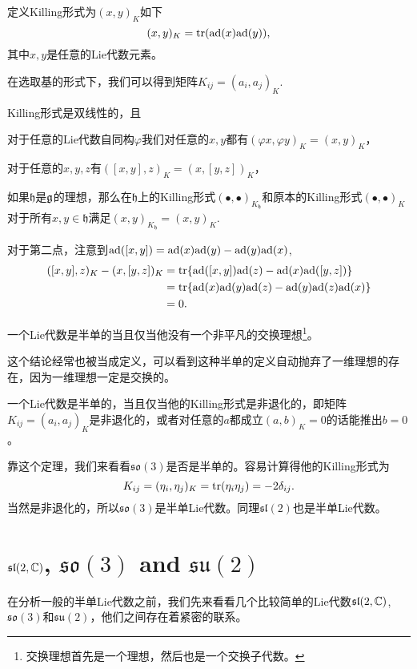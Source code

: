 \para
定义Killing形式为$(x,y)_K$如下
\[
	(x,y)_K=\operatorname{tr}({\mathrm{ad}}(x){\mathrm{ad}}(y)),
\]
其中$x,y$是任意的Lie代数元素。

在选取基的形式下，我们可以得到矩阵$K_{ij}=(a_i,a_j)_K$.

\begin{theo}
Killing形式是双线性的，且

对于任意的Lie代数自同构$\varphi$我们对任意的$x,y$都有$(\varphi x,\varphi y)_K=(x,y)_K$，

对于任意的$x,y,z$有$([x,y],z)_K=(x,[y,z])_K$，

如果$\mathfrak{h}$是${\mathfrak{g}}$的理想，那么在$\mathfrak{h}$上的Killing形式$(\bullet,\bullet)_{K_\mathfrak{h}}$和原本的Killing形式$(\bullet,\bullet)_{K}$对于所有$x,y\in \mathfrak{h}$满足$(x,y)_{K_\mathfrak{h}}=(x,y)_K$.
\end{theo}

对于第二点，注意到${\mathrm{ad}}([x,y])={\mathrm{ad}}(x){\mathrm{ad}}(y)-{\mathrm{ad}}(y){\mathrm{ad}}(x)$,
\[
	\begin{split}
		([x,y],z)_K-(x,[y,z])_K&=\operatorname{tr}\{{\mathrm{ad}}([x,y]){\mathrm{ad}}(z)-{\mathrm{ad}}(x){\mathrm{ad}}([y,z])\}\\
		&=\operatorname{tr}\{{\mathrm{ad}}(x){\mathrm{ad}}(y){\mathrm{ad}}(z)-{\mathrm{ad}}(y){\mathrm{ad}}(z){\mathrm{ad}}(x)\}\\
		&=0.
	\end{split}
\]

\begin{theo}
一个Lie代数是半单的当且仅当他没有一个非平凡的交换理想\footnote{交换理想首先是一个理想，然后也是一个交换子代数。}。
\end{theo}
这个结论经常也被当成定义，可以看到这种半单的定义自动抛弃了一维理想的存在，因为一维理想一定是交换的。

\begin{theo}
一个Lie代数是半单的，当且仅当他的Killing形式是非退化的，即矩阵$K_{ij}=(a_i,a_j)_K$是非退化的，或者对任意的$a$都成立$(a,b)_K=0$的话能推出$b=0$。
\end{theo}

靠这个定理，我们来看看$\mathfrak{so}(3)$是否是半单的。容易计算得他的Killing形式为
\[
	K_{ij}=(\eta_i,\eta_j)_K=\operatorname{tr}(\eta_i\eta_j)=-2\delta_{ij}.
\]
当然是非退化的，所以$\mathfrak{so}(3)$是半单Lie代数。同理$\mathfrak{sl}(2)$也是半单Lie代数。

\section{$\mathfrak{sl}(2,\mathbb{C})$, $\mathfrak{so}(3)$ and $\mathfrak{su}(2)$}
在分析一般的半单Lie代数之前，我们先来看看几个比较简单的Lie代数$\mathfrak{sl}(2,\mathbb{C})$, $\mathfrak{so}(3)$和$\mathfrak{su}(2)$，他们之间存在着紧密的联系。

